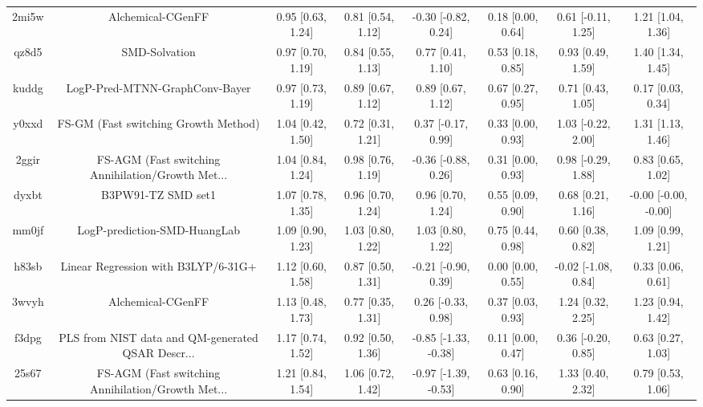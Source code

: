 \documentclass{article}
\begin{document}
\begin{center}
\begin{longtable}{|cccccccc|}
 2mi5w &                                  Alchemical-CGenFF &  0.95 [0.63, 1.24] &  0.81 [0.54, 1.12] &   -0.30 [-0.82, 0.24] &  0.18 [0.00, 0.64] &   0.61 [-0.11, 1.25] &     1.21 [1.04, 1.36] \\
 qz8d5 &                                      SMD-Solvation &  0.97 [0.70, 1.19] &  0.84 [0.55, 1.13] &     0.77 [0.41, 1.10] &  0.53 [0.18, 0.85] &    0.93 [0.49, 1.59] &     1.40 [1.34, 1.45] \\
 kuddg &                     LogP-Pred-MTNN-GraphConv-Bayer &  0.97 [0.73, 1.19] &  0.89 [0.67, 1.12] &     0.89 [0.67, 1.12] &  0.67 [0.27, 0.95] &    0.71 [0.43, 1.05] &     0.17 [0.03, 0.34] \\
 y0xxd &               FS-GM (Fast switching Growth Method) &  1.04 [0.42, 1.50] &  0.72 [0.31, 1.21] &    0.37 [-0.17, 0.99] &  0.33 [0.00, 0.93] &   1.03 [-0.22, 2.00] &     1.31 [1.13, 1.46] \\
 2ggir &  FS-AGM (Fast switching Annihilation/Growth Met... &  1.04 [0.84, 1.24] &  0.98 [0.76, 1.19] &   -0.36 [-0.88, 0.26] &  0.31 [0.00, 0.93] &   0.98 [-0.29, 1.88] &     0.83 [0.65, 1.02] \\
 dyxbt &                                 B3PW91-TZ SMD set1 &  1.07 [0.78, 1.35] &  0.96 [0.70, 1.24] &     0.96 [0.70, 1.24] &  0.55 [0.09, 0.90] &    0.68 [0.21, 1.16] &  -0.00 [-0.00, -0.00] \\
 mm0jf &                       LogP-prediction-SMD-HuangLab &  1.09 [0.90, 1.23] &  1.03 [0.80, 1.22] &     1.03 [0.80, 1.22] &  0.75 [0.44, 0.98] &    0.60 [0.38, 0.82] &     1.09 [0.99, 1.21] \\
 h83sb &                Linear Regression with B3LYP/6-31G+ &  1.12 [0.60, 1.58] &  0.87 [0.50, 1.31] &   -0.21 [-0.90, 0.39] &  0.00 [0.00, 0.55] &  -0.02 [-1.08, 0.84] &     0.33 [0.06, 0.61] \\
 3wvyh &                                  Alchemical-CGenFF &  1.13 [0.48, 1.73] &  0.77 [0.35, 1.31] &    0.26 [-0.33, 0.98] &  0.37 [0.03, 0.93] &    1.24 [0.32, 2.25] &     1.23 [0.94, 1.42] \\
 f3dpg &  PLS from NIST data and QM-generated QSAR Descr... &  1.17 [0.74, 1.52] &  0.92 [0.50, 1.36] &  -0.85 [-1.33, -0.38] &  0.11 [0.00, 0.47] &   0.36 [-0.20, 0.85] &     0.63 [0.27, 1.03] \\
 25s67 &  FS-AGM (Fast switching Annihilation/Growth Met... &  1.21 [0.84, 1.54] &  1.06 [0.72, 1.42] &  -0.97 [-1.39, -0.53] &  0.63 [0.16, 0.90] &    1.33 [0.40, 2.32] &     0.79 [0.53, 1.06] \\

\end{longtable}
\end{center}
\end{document}
